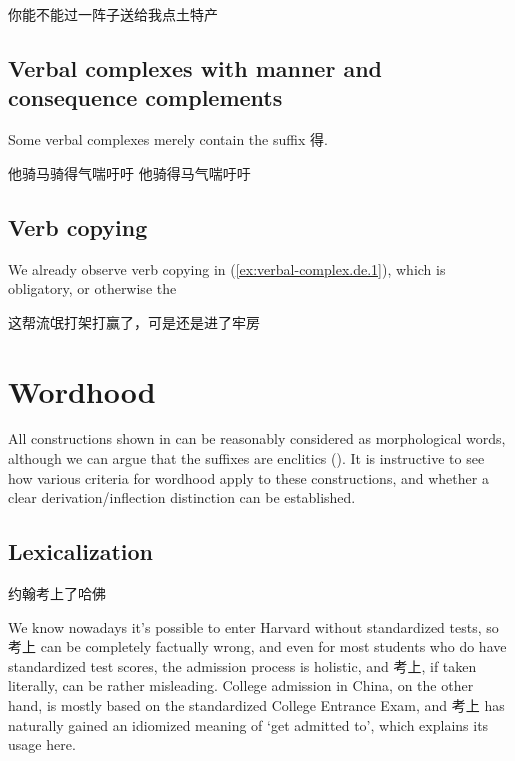 \documentclass[UTF8, a4paper, oneside, scheme=plain, 12pt]{ctexrep}
\newcommand{\translate}[1]{`#1'}
\begin{document}
\begin{exe}
    \ex\label{ex:sec:verbal-complex.v-neg-v.4} 你能不能过一阵子送给我点土特产
\end{exe}

\subsection{Verbal complexes with manner and consequence complements}
\label{sec:verbal-complex.de}

Some verbal complexes merely contain the suffix 得.


\begin{exe}
    \ex\label{ex:verbal-complex.de.1} 他骑马骑得气喘吁吁
    \ex 他骑得马气喘吁吁
\end{exe}

\subsection{Verb copying}

We already observe verb copying in (\ref{ex:verbal-complex.de.1}),
which is obligatory, or otherwise the 

\begin{exe}
    \ex 这帮流氓打架打赢了，可是还是进了牢房
\end{exe}

\section{Wordhood}\label{sec:verbal-complex.wordhood}

All constructions shown in 
can be reasonably considered as morphological words,
although we can argue that the suffixes are enclitics
().
It is instructive to see how various criteria for wordhood apply to these constructions,
and whether a clear derivation/inflection distinction can be established.

\subsection{Lexicalization}\label{sec:verbal-complex.lexicalization}

\begin{exe}
    \ex 约翰考上了哈佛
\end{exe}

We know nowadays it's possible to enter Harvard without standardized tests,
so 考上 can be completely factually wrong,
and even for most students who do have standardized test scores,
the admission process is holistic, and 考上, if taken literally,
can be rather misleading.
College admission in China, on the other hand, is mostly based on the standardized College Entrance Exam,
and 考上 has naturally gained an idiomized meaning of \translate{get admitted to},
which explains its usage here.
\end{document}
